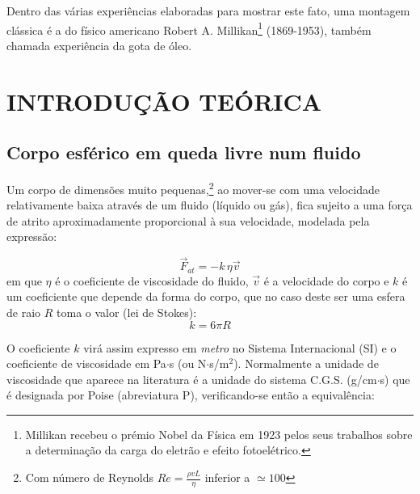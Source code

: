 \documentclass[a4paper,twoside,12pt]{article}      %
\begin{document}
        Dentro das várias experiências elaboradas para mostrar este fato, uma montagem clássica é a do físico americano Robert A. Millikan\footnote{Millikan recebeu o prémio Nobel da Física em 1923 pelos seus trabalhos sobre a determinação da carga do eletrão e efeito fotoelétrico.} (1869-1953), também chamada experiência da gota de óleo.

        \section{\sf INTRODUÇÃO TEÓRICA}
        \subsection{\sf Corpo esférico em queda livre num fluido}
        Um corpo de dimensões muito pequenas,\footnote{Com número de Reynolds $Re= \frac{\rho v L}{\eta}$ inferior a $\simeq 100$}  ao mover-se com uma velocidade relativamente baixa através de um fluido (líquido ou gás), fica sujeito a uma força de atrito aproximadamente proporcional à sua velocidade, modelada pela expressão:

        \begin{equation}
            \label{eq:f_atrito}
            \vec{F}_{at} = - k \, \eta \vec{v}
        \end{equation}
        em que $\eta$ é o coeficiente de viscosidade do fluido, $\vec{v}$ é a velocidade do corpo e $k$ é um coeficiente que depende da forma do corpo, que no caso deste ser uma esfera de raio $R$ toma o valor (lei de Stokes): 
        \begin{equation}
            \label{eq:coef_atrito}
            k = 6 \pi R
        \end{equation}


        O coeficiente $k$ virá assim expresso em \emph{metro} no Sistema Internacional (SI) e o coeficiente de viscosidade em Pa$\cdot$s (ou N$\cdot$s/m$^2$).
        Normalmente a unidade de viscosidade que aparece na literatura é a unidade do sistema C.G.S. (g/cm$\cdot$s) que é designada por Poise (abreviatura P), verificando-se então a equivalência:
\end{document}
